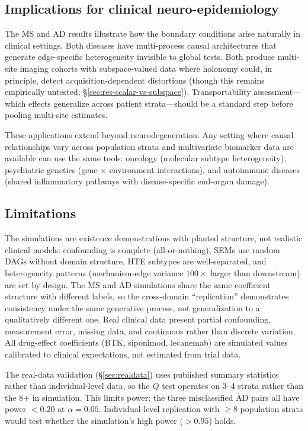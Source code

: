 \documentclass{article}
\begin{document}
\subsection{Implications for clinical neuro-epidemiology}

The MS and AD results illustrate how the boundary conditions arise naturally in clinical settings.
Both diseases have multi-process causal architectures that generate edge-specific heterogeneity invisible to global tests.
Both produce multi-site imaging cohorts with subspace-valued data where holonomy could, in principle, detect acquisition-dependent distortions (though this remains empirically untested; \S\ref{sec:res-scalar-vs-subspace}).
Transportability assessment---which effects generalize across patient strata---should be a standard step before pooling multi-site estimates.

These applications extend beyond neurodegeneration.
Any setting where causal relationships vary across population strata and multivariate biomarker data are available can use the same tools: oncology (molecular subtype heterogeneity), psychiatric genetics (gene $\times$ environment interactions), and autoimmune diseases (shared inflammatory pathways with disease-specific end-organ damage).

\subsection{Limitations}

The simulations are existence demonstrations with planted structure, not realistic clinical models: confounding is complete (all-or-nothing), SEMs use random DAGs without domain structure, HTE subtypes are well-separated, and heterogeneity patterns (mechanism-edge variance $100\times$ larger than downstream) are set by design.
The MS and AD simulations share the same coefficient structure with different labels, so the cross-domain ``replication'' demonstrates consistency under the same generative process, not generalization to a qualitatively different one.
Real clinical data present partial confounding, measurement error, missing data, and continuous rather than discrete variation.
All drug-effect coefficients (BTK, siponimod, lecanemab) are simulated values calibrated to clinical expectations, not estimated from trial data.

The real-data validation (\S\ref{sec:realdata}) uses published summary statistics rather than individual-level data, so the $Q$ test operates on 3--4 strata rather than the 8+ in simulation.
This limits power: the three misclassified AD pairs all have power $< 0.20$ at $\alpha = 0.05$.
Individual-level replication with $\geq 8$ population strata would test whether the simulation's high power ($> 0.95$) holds.
\end{document}
